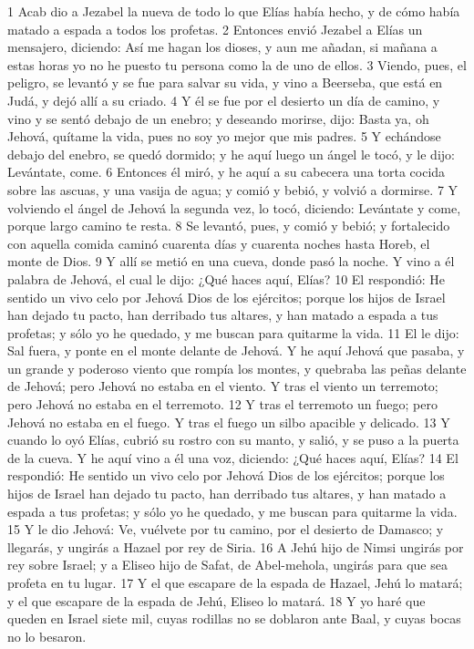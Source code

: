 1 Acab dio a Jezabel la nueva de todo lo que Elías había hecho, y de cómo había matado a espada a todos los profetas.
2 Entonces envió Jezabel a Elías un mensajero, diciendo: Así me hagan los dioses, y aun me añadan, si mañana a estas horas yo no he puesto tu persona como la de uno de ellos.
3 Viendo, pues, el peligro, se levantó y se fue para salvar su vida, y vino a Beerseba, que está en Judá, y dejó allí a su criado.
4 Y él se fue por el desierto un día de camino, y vino y se sentó debajo de un enebro; y deseando morirse, dijo: Basta ya, oh Jehová, quítame la vida, pues no soy yo mejor que mis padres.
5 Y echándose debajo del enebro, se quedó dormido; y he aquí luego un ángel le tocó, y le dijo: Levántate, come.
6 Entonces él miró, y he aquí a su cabecera una torta cocida sobre las ascuas, y una vasija de agua; y comió y bebió, y volvió a dormirse.
7 Y volviendo el ángel de Jehová la segunda vez, lo tocó, diciendo: Levántate y come, porque largo camino te resta.
8 Se levantó, pues, y comió y bebió; y fortalecido con aquella comida caminó cuarenta días y cuarenta noches hasta Horeb, el monte de Dios.
9 Y allí se metió en una cueva, donde pasó la noche. Y vino a él palabra de Jehová, el cual le dijo: ¿Qué haces aquí, Elías?
10 El respondió: He sentido un vivo celo por Jehová Dios de los ejércitos; porque los hijos de Israel han dejado tu pacto, han derribado tus altares, y han matado a espada a tus profetas; y sólo yo he quedado, y me buscan para quitarme la vida. 
11 El le dijo: Sal fuera, y ponte en el monte delante de Jehová. Y he aquí Jehová que pasaba, y un grande y poderoso viento que rompía los montes, y quebraba las peñas delante de Jehová; pero Jehová no estaba en el viento. Y tras el viento un terremoto; pero Jehová no estaba en el terremoto.
12 Y tras el terremoto un fuego; pero Jehová no estaba en el fuego. Y tras el fuego un silbo apacible y delicado.
13 Y cuando lo oyó Elías, cubrió su rostro con su manto, y salió, y se puso a la puerta de la cueva. Y he aquí vino a él una voz, diciendo: ¿Qué haces aquí, Elías?
14 El respondió: He sentido un vivo celo por Jehová Dios de los ejércitos; porque los hijos de Israel han dejado tu pacto, han derribado tus altares, y han matado a espada a tus profetas; y sólo yo he quedado, y me buscan para quitarme la vida. 
15 Y le dio Jehová: Ve, vuélvete por tu camino, por el desierto de Damasco; y llegarás, y ungirás a Hazael por rey de Siria. 
16 A Jehú hijo de Nimsi ungirás por rey sobre Israel; y a Eliseo hijo de Safat, de Abel-mehola, ungirás para que sea profeta en tu lugar.
17 Y el que escapare de la espada de Hazael, Jehú lo matará; y el que escapare de la espada de Jehú, Eliseo lo matará.
18 Y yo haré que queden en Israel siete mil, cuyas rodillas no se doblaron ante Baal, y cuyas bocas no lo besaron.

